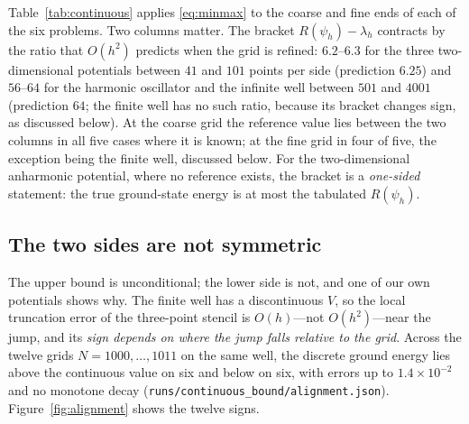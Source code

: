 Table~\ref{tab:continuous} applies \eqref{eq:minmax} to the coarse and fine
ends of each of the six problems. Two columns matter. The bracket
$R(\psi_h)-\lambda_h$ contracts by the ratio that $O(h^2)$ predicts when the
grid is refined: $6.2$--$6.3$ for the three two-dimensional potentials between
$41$ and $101$ points per side (prediction $6.25$) and $56$--$64$ for the
harmonic oscillator and the infinite well between $501$ and $4001$ (prediction $64$;
the finite well has no such ratio, because its bracket changes sign, as
discussed below). At the
coarse grid the reference value lies between the two columns in all five
cases where it is known; at the fine grid in four of five, the exception
being the finite well, discussed below. For the
two-dimensional anharmonic potential, where no reference exists, the bracket
is a \emph{one-sided} statement: the true ground-state energy is at most the
tabulated $R(\psi_h)$.

\begin{table}[t]
\centering

\caption{Discrete eigenvalue $\lambda_h$ (the midpoint of a directed-rounding
bracket wherever the potential is separable---all one-dimensional rows, and
the harmonic and box in two dimensions; a sparse-factorization eigenvalue
for the anharmonic potential) and the
variational upper bound $R(\psi_h)$ of \eqref{eq:minmax} on the P1/Q1
interpolant of the discrete eigenvector. The final column asks whether the
reference value $\lambda^\star$ lies in $[\lambda_h,R(\psi_h)]$; ``--'' means
no reference is known. The finite well's failure at $N=4001$ is real---it
fails already at $N=2001$---and is discussed in the text.}
\label{tab:continuous}
\end{table}

\subsection{The two sides are not symmetric}

The upper bound is unconditional; the lower side is not, and one of our own
potentials shows why. The finite well has a discontinuous $V$, so the local
truncation error of the three-point stencil is $O(h)$---not $O(h^2)$---near the
jump, and its \emph{sign depends on where the jump falls relative to the
grid}. Across the twelve grids $N=1000,\dots,1011$ on the same well, the
discrete ground energy lies above the continuous value on six and below on
six, with errors up to $1.4\times10^{-2}$ and no monotone decay
(\texttt{runs/continuous\_bound/alignment.json}). Figure~\ref{fig:alignment}
shows the twelve signs.

